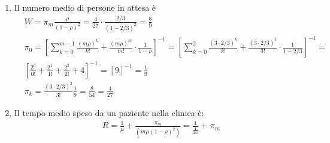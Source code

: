 \begin{enumerate}
    \item  Il numero medio di persone in attesa è
            \begin{align*}
                 & W = \pi_m \frac{\rho}{(1-\rho)^2} = \frac{4}{27} \cdot \frac{2/3}{(1-2/3)^2} = \frac{8}{9}\\
                 & \pi_0 = \left [  \sum_{k=0}^{m-1} \frac{(m\rho)^k}{k!} +  \frac{(m\rho)^m}{m!}\cdot \frac{1}{1-\rho} \right ]^{-1} = \left [  \sum_{k=0}^{2} \frac{(3 \cdot 2/3)^k}{k!} +  \frac{(3 \cdot 2/3)^3}{3!}\cdot \frac{1}{1-2/3} \right ]^{-1} = \\
                 & \left [ \frac{2^0}{0!}+ \frac{2^1}{1!} + \frac{2^2}{2!} + 4 \right]^{-1} = [9]^{-1} = \frac{1}{9}\\
                 & \pi_k = \frac{(3\cdot 2/3)^3}{3!} \frac{1}{9} = \frac{8}{54} = \frac{4}{27}
            \end{align*}
    
    \item Il tempo medio speso da un paziente nella clinica è:
            \begin{align*}
                   & R = \frac{1}{\mu} + \frac{\pi_m}{(m\mu(1-\rho)^2)} = \frac{1}{\frac{1}{20}} + \frac{}{}\pi_m
            \end{align*}
\end{enumerate}

